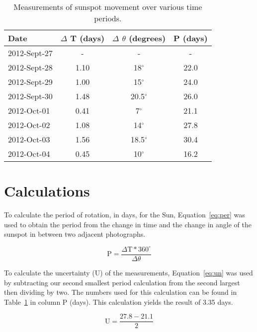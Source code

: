 \documentclass{article}
\begin{document}
\begin{table}[h!]
\begin{center}
\begin{tabular}{l c c c}
\hline
Date & $\Delta$ T (days) & $\Delta$ $\theta$ (degrees) & P (days) \\
\hline
\hline
2012-Sept-27 & - & - & - \\
2012-Sept-28 & 1.10 & 18$^\circ$ & 22.0 \\
2012-Sept-29 & 1.00 & 15$^\circ$ & 24.0 \\
2012-Sept-30 & 1.48 & 20.5$^\circ$ & 26.0 \\
2012-Oct-01 & 0.41 & 7$^\circ$ & 21.1 \\
2012-Oct-02 & 1.08 & 14$^\circ$ & 27.8 \\
2012-Oct-03 & 1.56 & 18.5$^\circ$ & 30.4 \\
2012-Oct-04 & 0.45 & 10$^\circ$ & 16.2 \\
\hline
\end{tabular}
\end{center}
\caption{Measurements of sunspot movement over various time periods.\label{tab:main}}
\end{table}


\section{Calculations}

To calculate the period of rotation, in days, for the Sun, Equation~\ref{eq:per} was used to obtain the period from
the change in time and the change in angle of the sunspot in between two adjacent photographs.

\begin{equation}
\label{eq:per}
\text{P} = \frac{\Delta\text{T} * 360^\circ}{\Delta\theta}
\end{equation}

To calculate the uncertainty (U) of the measurements, Equation~\ref{eq:un} was used by subtracting our second 
smallest period calculation from the second largest then dividing by two. The numbers used for this calculation
can be found in Table~\ref{tab:main} in column P (days). This calculation yields the result of 3.35 days.

\begin{equation}
\label{eq:un}
\text{U} = \frac{27.8 - 21.1}{2}
\end{equation}
\end{document}
